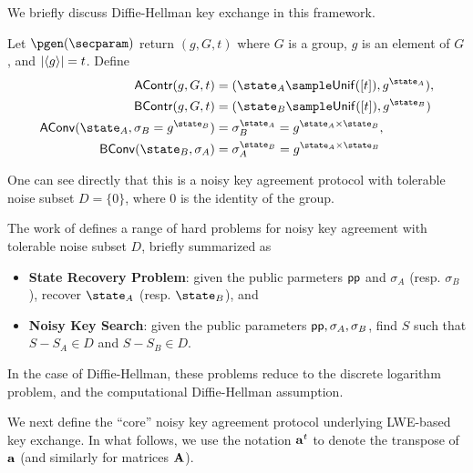 We briefly discuss Diffie-Hellman key exchange in this framework.
\begin{example}
	Let $\pgen(\secparam)$ return $(g, G, t)$ where $G$ is a group, $g$ is an element of $G$, and $\abs{\langle g\rangle} = t$. Define
	\begin{align*}
	\mathsf{AContr}(g, G, t) &= (\state_A\sample \mathsf{Unif}([t]), g^{\state_A}),\\
	\mathsf{BContr}(g, G, t) &= (\state_B\sample \mathsf{Unif}([t]), g^{\state_B})\\
	\mathsf{AConv}(\state_A, \sigma_B = g^{\state_B}) &= \sigma_B^{\state_A} = g^{\state_A\times \state_B},\\
	\mathsf{BConv}(\state_B, \sigma_A) &= \sigma_A^{\state_B} = g^{\state_A \times \state_B}
	\end{align*}
\end{example}

One can see directly that this is a noisy key agreement protocol with tolerable noise subset $D = \{0\}$, where $0$ is the identity of the group.

The work of \cite{EPRINT:SzeReyPre18} defines a range of hard problems for noisy key agreement with tolerable noise subset $D$, briefly summarized as
\begin{itemize}
	\item \textbf{State Recovery Problem}: given the public parmeters $\mathsf{pp}$ and $\sigma_A$ (resp. $\sigma_B$), recover $\state_A$ (resp. $\state_B$), and
	\item \textbf{Noisy Key Search}: given the public parameters $\mathsf{pp}, \sigma_A, \sigma_B$, find $S$ such that $S-S_A \in D$ and $S- S_B\in D$.
\end{itemize}
In the case of Diffie-Hellman, these problems reduce to the discrete logarithm problem, and the computational Diffie-Hellman assumption.

We next define the ``core'' noisy key agreement protocol underlying LWE-based key exchange.
In what follows, we use the notation $\mathbf{a}^t$ to denote the transpose of $\mathbf{a}$ (and similarly for matrices $\mathbf{A}$).

